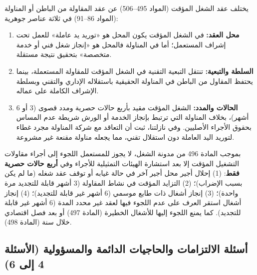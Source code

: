 \vspace{0.25cm}\par\smallskip
يختلف عقد الشغل المؤقت (المواد \textenglish{495}--\textenglish{506}) عن عقد المقاولة من الباطن أو المناولة (المواد \textenglish{86}--\textenglish{91}) في ثلاثة عناصر جوهرية:
\begin{enumerate}[leftmargin=*, itemsep=4pt]
    \item \textbf{محل العقد:} في الشغل المؤقت يكون المحل هو «توريد يد عاملة» للعمل تحت إشراف المستعمل؛ أما في المناولة فالمحل هو «إنجاز شغل فني أو خدمة متخصصة» بتحقيق نتيجة مستقلة.
    \item \textbf{السلطة والتبعية:} تنتقل التبعية التقنية في الشغل المؤقت للمقاولة المستعملة، بينما يحتفظ المقاول من الباطن في المناولة الحقيقية باستقلاله الإداري والتقني وبسلطة الإشراف الكاملة على عماله.
    \item \textbf{الحالات والمدد:} الشغل المؤقت مقيد بأربع حالات حصرية ومدد قصوى (\textenglish{3} أو \textenglish{6} أشهر)، بخلاف المناولة التي ترتبط بإنجاز الخدمة أو الورش شريطة عدم المساس بحقوق الأجراء الأصليين. وفي نازلتنا، ثبت أن التعاقد مع شركة المناولة مجرد غطاء لتوريد اليد العاملة دون استقلال تقني، مما يجعله مناولة مقنعة غير مشروعة.
\end{enumerate}

\vspace{0.25cm}\par\smallskip
بموجب المادة \textenglish{496} من مدونة الشغل، لا يجوز للمستعمل اللجوء إلى أجراء مقاولات التشغيل المؤقت إلا بعد استشارة الهيئات التمثيلية للأجراء وفي \textbf{أربع حالات حصرية فقط}:
(\textenglish{1}) إحلال أجير محل أجير آخر في حالة غيابه أو توقف عقد شغله (ما لم يكن بسبب الإضراب)؛
(\textenglish{2}) التزايد المؤقت في نشاط المقاولة (\textenglish{3} أشهر قابلة للتجديد مرة واحدة)؛
(\textenglish{3}) إنجاز أشغال ذات طابع موسمي (\textenglish{6} أشهر غير قابلة للتجديد)؛
(\textenglish{4}) إنجاز أشغال استقر العرف على عدم اللجوء فيها لعقد غير محدد المدة (\textenglish{6} أشهر غير قابلة للتجديد). كما يمنع اللجوء إليها للأشغال الخطيرة (المادة \textenglish{497}) أو بعد فصل اقتصادي خلال سنة (المادة \textenglish{498}).

\subsection{أسئلة الالتزامات والحاجيات الدائمة والمسؤولية (الأسئلة 4 إلى 6)}

